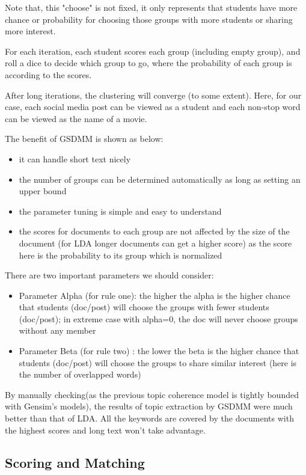 \documentclass[sigchi]{acmart}
\begin{document}
Note that, this "choose" is not fixed, it only represents that students have more chance or probability for choosing those groups with more students or sharing more interest.

For each iteration, each student scores each group (including empty group), and roll a dice to decide which group to go, where the probability of each group is according to the scores.

After long iterations, the clustering will converge (to some extent). Here, for our case, each social media post can be viewed as a student and each non-stop word can be viewed as the name of a movie.

The benefit of GSDMM is shown as below:
\begin{itemize}
    \item it can handle short text nicely
    \item the number of groups can be determined automatically as long as setting an upper bound
    \item the parameter tuning is simple and easy to understand
    \item the scores for documents to each group are not affected by the size of the document (for LDA longer documents can get a higher score) as the score here is the probability to its group which is normalized
\end{itemize}

There are two important parameters we should consider:
\begin{itemize}
    \item Parameter Alpha (for rule one): 
the higher the alpha is the higher chance that students (doc/post) will choose the groups with fewer students (doc/post); in extreme case with alpha=0, the doc will never choose groups without any member
    \item Parameter Beta (for rule two) : 
the lower the beta is the higher chance that students (doc/post) will choose the groups to share  similar interest (here is the number of overlapped words)
\end{itemize}
By manually checking(as the previous topic coherence model is tightly bounded with Gensim's models), the results of topic extraction by GSDMM were much better than that of LDA. All the keywords are covered by the documents with the highest scores and long text won't take advantage. 

\subsection{Scoring and Matching}\label{sec:Scoring and Matching}
\end{document}
